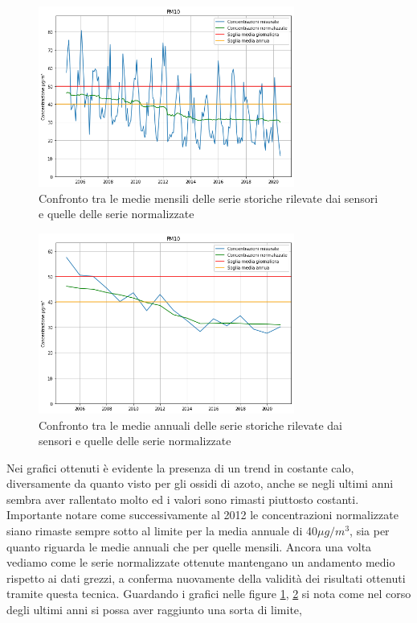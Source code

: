 \documentclass[a4paper,12pt]{report}
\begin{document}
\begin{figure}[h]
\centering
\includegraphics[width=0.75\textwidth]{pm10_medie_mensili}
\caption{Confronto tra le medie mensili delle serie storiche rilevate dai sensori e quelle delle serie normalizzate}
\label{fig:pm10_medie_mensili}
\end{figure}

\begin{figure}[h]
\centering
\includegraphics[width=0.75\textwidth]{pm10_medie_annuali}
\caption{Confronto tra le medie annuali delle serie storiche rilevate dai sensori e quelle delle serie normalizzate}
\label{fig:pm10_medie_annuali}
\end{figure}

Nei grafici ottenuti è evidente la presenza di un trend in costante calo, diversamente da quanto visto per gli ossidi di azoto, anche se negli ultimi anni sembra aver rallentato molto ed i valori sono rimasti piuttosto costanti.
Importante notare come successivamente al 2012 le concentrazioni normalizzate siano rimaste sempre sotto al limite per la media annuale di 40$\mu g/m^3$, sia per quanto riguarda le medie annuali che per quelle mensili.
Ancora una volta vediamo come le serie normalizzate ottenute mantengano un andamento medio rispetto ai dati grezzi, a conferma nuovamente della validità dei risultati ottenuti tramite questa tecnica.
Guardando i grafici nelle figure \ref{fig:pm10_medie_mensili}, \ref{fig:pm10_medie_annuali} si nota come nel corso degli ultimi anni si possa aver raggiunto una sorta di limite,
\end{document}
